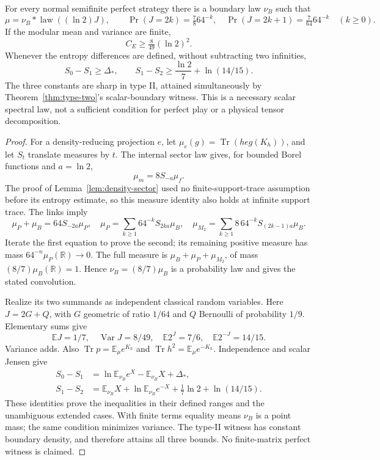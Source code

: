 \begin{theorem}\label{thm:fingerprint}
For every normal semifinite perfect strategy there is a boundary law $\nu_B$ such that
\[
 \mu=\nu_B*\operatorname{law}((\ln2)J),\qquad
 \Pr(J=2k)=\tfrac78 64^{-k},\quad
 \Pr(J=2k+1)=\tfrac7{64}64^{-k}\quad(k\ge0).
\]
If the modular mean and variance are finite,
\[
 C_E\ge\tfrac8{49}(\ln2)^2.
\]
Whenever the entropy differences are defined, without subtracting two infinities,
\[
 S_0-S_1\ge\Delta_*,\qquad
 S_1-S_2\ge\frac{\ln2}{7}+\ln(14/15).
\]
The three constants are sharp in type II, attained simultaneously by Theorem~\ref{thm:type-two}'s scalar-boundary witness. This is a necessary scalar spectral law, not a sufficient condition for perfect play or a physical tensor decomposition.
\end{theorem}
\begin{proof}
For a density-reducing projection $e$, let $\mu_e(g)=\operatorname{Tr}(he g(K_h))$, and let $S_t$ translate measures by $t$. The internal sector law gives, for bounded Borel functions and $a=\ln2$,
\[
 \mu_m=8S_{-a}\mu_f.
\]
The proof of Lemma~\ref{lem:density-sector} used no finite-support-trace assumption before its entropy estimate, so this measure identity also holds at infinite support trace. The links imply
\[
 \mu_P+\mu_B=64S_{-2a}\mu_P,
 \quad\mu_P=\sum_{k\ge1}64^{-k}S_{2ka}\mu_B,
 \quad\mu_{M_2}=\sum_{k\ge1}8\,64^{-k}S_{(2k-1)a}\mu_B.
\]
Iterate the first equation to prove the second; its remaining positive measure has mass $64^{-n}\mu_P(\mathbb R)\to0$. The full measure is $\mu_B+\mu_P+\mu_{M_2}$, of mass $(8/7)\mu_B(\mathbb R)=1$. Hence $\nu_B=(8/7)\mu_B$ is a probability law and gives the stated convolution.

Realize its two summands as independent classical random variables. Here $J=2G+Q$, with $G$ geometric of ratio $1/64$ and $Q$ Bernoulli of probability $1/9$. Elementary sums give
\[
 \mathbb EJ=1/7,\quad\operatorname{Var}J=8/49,
 \quad\mathbb E2^J=7/6,\quad\mathbb E2^{-J}=14/15.
\]
Variance adds. Also $\operatorname{Tr}p=\mathbb E_\mu e^{K_h}$ and $\operatorname{Tr}h^2=\mathbb E_\mu e^{-K_h}$. Independence and scalar Jensen give
\begin{align*}
 S_0-S_1&=\ln\mathbb E_{\nu_B}e^X-\mathbb E_{\nu_B}X+\Delta_*,\\
 S_1-S_2&=\mathbb E_{\nu_B}X+\ln\mathbb E_{\nu_B}e^{-X}
                         +\tfrac17\ln2+\ln(14/15).
\end{align*}
These identities prove the inequalities in their defined ranges and the unambiguous extended cases. With finite terms equality means $\nu_B$ is a point mass; the same condition minimizes variance. The type-II witness has constant boundary density, and therefore attains all three bounds. No finite-matrix perfect witness is claimed.
\end{proof}

